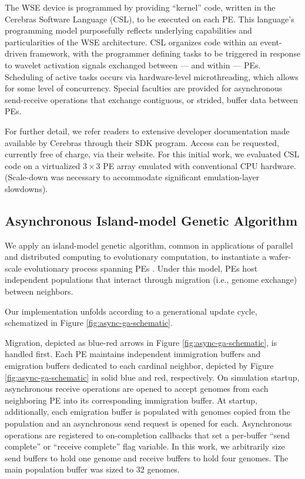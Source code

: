 The WSE device is programmed by providing ``kernel'' code, written in the Cerebras Software Language (CSL), to be executed on each PE.
This language's programming model purposefully reflects underlying capabilities and particularities of the WSE architecture.
CSL organizes code within an event-driven framework, with the programmer defining tasks to be triggered in response to wavelet activation signals exchanged between --- and within --- PEs.
Scheduling of active tasks occurs via hardware-level microthreading, which allows for some level of concurrency.
Special faculties are provided for asynchronous send-receive operations that exchange contiguous, or strided, buffer data between PEs.

For further detail, we refer readers to extensive developer documentation made available by Cerebras through their SDK program.
Access can be requested, currently free of charge, via their website.
For this initial work, we evaluated CSL code on a virtualized $3\times3$ PE array emulated with conventional CPU hardware.
(Scale-down was necessary to accommodate significant emulation-layer slowdowns).

\subsection{Asynchronous Island-model Genetic Algorithm}



We apply an island-model genetic algorithm, common in applications of parallel and distributed computing to evolutionary computation, to instantiate a wafer-scale evolutionary process spanning PEs \citep{bennett1999building}.
Under this model, PEs host independent populations that interact through migration (i.e., genome exchange) between neighbors.

Our implementation unfolds according to a generational update cycle, schematized in Figure \ref{fig:async-ga-schematic}.

Migration, depicted as blue-red arrows in Figure \ref{fig:async-ga-schematic}, is handled first.
Each PE maintains independent immigration buffers and emigration buffers dedicated to each cardinal neighbor, depicted by Figure \ref{fig:async-ga-schematic} in solid blue and red, respectively.
On simulation startup, asynchronous receive operations are opened to accept genomes from each neighboring PE into its corresponding immigration buffer.
At startup, additionally, each emigration buffer is populated with genomes copied from the population and an asynchronous send request is opened for each. %
Asynchronous operations are registered to on-completion callbacks that set a per-buffer ``send complete'' or ``receive complete'' flag variable.
In this work, we arbitrarily size send buffers to hold one genome and receive buffers to hold four genomes.
The main population buffer was sized to 32 genomes.

